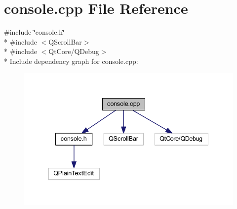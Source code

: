 \hypertarget{a00032}{\section{console.\+cpp File Reference}
\label{a00032}
}
{\ttfamily \#include \char`\"{}console.\+h\char`\"{}}\\*
{\ttfamily \#include $<$Q\+Scroll\+Bar$>$}\\*
{\ttfamily \#include $<$Qt\+Core/\+Q\+Debug$>$}\\*
Include dependency graph for console.\+cpp\+:
\nopagebreak
\begin{figure}[H]
\begin{center}
\leavevmode
\includegraphics[width=337pt]{d0/d4a/a00147}
\end{center}
\end{figure}
